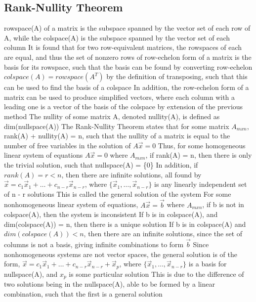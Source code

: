 \documentclass[11 pt, twoside]{article}
\newenvironment{outline*}
{
	\begin{outline}[enumerate]
	}
	{\end{outline}
}
\begin{document}
\subsection{Rank-Nullity Theorem}
\begin{outline*}
\1 rowspace(A) of a matrix is the subspace spanned by the vector set of each row of A, while the colspace(A) is the subspace spanned by the vector set of each column
\2 It is found that for two row-equivalent matrices, the rowspaces of each are equal, and thus the set of nonzero rows of row-echelon form of a matrix is the basis for its rowspace, such that the basis can be found by converting row-echelon
\2 $colspace(A) = rowspace(A^T)$ by the definition of transposing, such that this can be used to find the basis of a colspace
\3 In addition, the row-echelon form of a matrix can be used to produce simplified vectors, where each column with a leading one is a vector of the basis of the colspace by extension of the previous method
\1 The nullity of some matrix A, denoted nullity(A), is defined as dim(nullspace(A))
\1 The Rank-Nullity Theorem states that for some matrix $A_{mxn}$, rank(A) + nullity(A) = n, such that the nullity of a matrix is equal to the number of free variables in the solution of $A\vec{x} = 0$
\2 Thus, for some homogeneous linear system of equations $A\vec{x} = 0$ where $A_{mxn}$, if rank(A) = n, then there is only the trivial solution, such that nullspace(A) = \{0\}
\3 In addition, if $rank(A) = r < n$, then there are infinite solutions, all found by $\vec{x} = c_1\vec{x}_1 + \dots + c_{n-r}\vec{x}_{n-r}$, where $\{\vec{x}_1, \dots, \vec{x}_{n-r}\}$ is any linearly independent set of n - r solutions
\3 This is called the general solution of the system
\2 For some nonhomogeneous linear system of equations, $A\vec{x} = \vec{b}$ where $A_{mxn}$, if b is not in colspace(A), then the system is inconsistent
\3 If b is in colspace(A), and dim(colspace(A)) = n, then there is a unique solution
\3 If b is in colspace(A) and $dim(colspace(A)) < n$, then there are an infinite solutions, since the set of columns is not a basis, giving infinite combinations to form $\vec{b}$
\3 Since nonhomogeneous systems are not vector spaces, the general solution is of the form, $\vec{x} = c_1\vec{x}_1 + \dots + c_{n-r}\vec{x}_{n-r} + \vec{x}_p$, where $\{\vec{x}_1, \dots, \vec{x}_{n-r}\}$ is a basis for nullspace(A), and $x_p$ is some particular solution
\4 This is due to the difference of two solutions being in the nullspace(A), able to be formed by a linear combination, such that the first is a general solution
\end{outline*}
\end{document}
